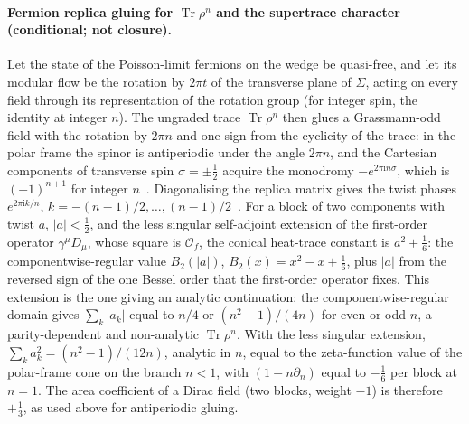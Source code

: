 \paragraph{Fermion replica gluing for \(\operatorname{Tr}\rho^n\) and the supertrace character (conditional; not closure).}
Let the state of the Poisson-limit fermions on the wedge be quasi-free, and let its modular flow be the rotation by \(2\pi t\) of the transverse plane of \(\Sigma\), acting on every field through its representation of the rotation group (for integer spin, the identity at integer \(n\)). The ungraded trace \(\operatorname{Tr}\rho^n\) then glues a Grassmann-odd field with the rotation by \(2\pi n\) and one sign from the cyclicity of the trace: in the polar frame the spinor is antiperiodic under the angle \(2\pi n\), and the Cartesian components of transverse spin \(\sigma=\pm\tfrac12\) acquire the monodromy \(-e^{2\pi\mathrm in\sigma}\), which is \((-1)^{n+1}\) for integer \(n\)~\cite{CasiniHuerta2009,FursaevMiele1997}. Diagonalising the replica matrix gives the twist phases \(e^{2\pi\mathrm ik/n}\), \(k=-(n-1)/2,\dots,(n-1)/2\)~\cite{CasiniHuerta2009}. For a block of two components with twist \(a\), \(|a|<\tfrac12\), and the less singular self-adjoint extension of the first-order operator \(\gamma^\mu D_\mu\), whose square is \(\mathcal O_f\), the conical heat-trace constant is \(a^2+\tfrac16\): the componentwise-regular value \(B_2(|a|)\), \(B_2(x)=x^2-x+\tfrac16\), plus \(|a|\) from the reversed sign of the one Bessel order that the first-order operator fixes. This extension is the one giving an analytic continuation: the componentwise-regular domain gives \(\sum_k|a_k|\) equal to \(n/4\) or \((n^2-1)/(4n)\) for even or odd \(n\), a parity-dependent and non-analytic \(\operatorname{Tr}\rho^n\). With the less singular extension, \(\sum_ka_k^2=(n^2-1)/(12n)\), analytic in \(n\), equal to the zeta-function value of the polar-frame cone on the branch \(n<1\), with \((1-n\partial_n)\) equal to \(-\tfrac16\) per block at \(n=1\). The area coefficient of a Dirac field (two blocks, weight \(-1\)) is therefore \(+\tfrac13\), as used above for antiperiodic gluing.

